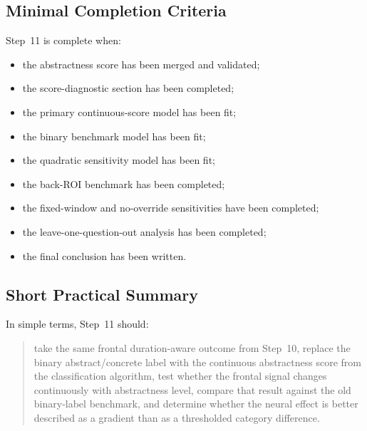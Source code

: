 \subsection{Minimal Completion Criteria}
Step~11 is complete when:
\begin{itemize}
    \item the abstractness score has been merged and validated;
    \item the score-diagnostic section has been completed;
    \item the primary continuous-score model has been fit;
    \item the binary benchmark model has been fit;
    \item the quadratic sensitivity model has been fit;
    \item the back-ROI benchmark has been completed;
    \item the fixed-window and no-override sensitivities have been completed;
    \item the leave-one-question-out analysis has been completed;
    \item the final conclusion has been written.
\end{itemize}

\subsection{Short Practical Summary}
In simple terms, Step~11 should:
\begin{quote}
take the same frontal duration-aware outcome from Step~10, replace the binary abstract/concrete
label with the continuous abstractness score from the classification algorithm, test whether the
frontal signal changes continuously with abstractness level, compare that result against the old
binary-label benchmark, and determine whether the neural effect is better described as a gradient
than as a thresholded category difference.
\end{quote}